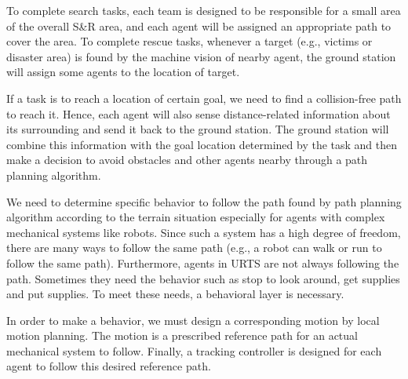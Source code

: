 \documentclass{ieeeaccess}
\begin{document}
To complete search tasks, each team is designed to be responsible for a small area of the overall S\&R area, and each agent will be assigned an appropriate path to cover the area. To complete rescue tasks, whenever a target (e.g., victims or disaster area) is found by the machine vision of nearby agent, the ground station will assign some agents to the location of target. 

If a task is to reach a location of certain goal, we need to find a collision-free path to reach it. 
Hence, each agent will also sense distance-related information about its surrounding and send it back to the ground station. The ground station will combine this information with the goal location determined by the task and then make a decision to avoid obstacles and other agents nearby through a path planning algorithm.

We need to determine specific behavior to follow the path found by path planning algorithm according to the terrain situation especially for agents with complex mechanical systems like robots. Since such a system has a high degree of freedom, there are many ways to follow the same path (e.g., a robot can walk or run to follow the same path). Furthermore, agents in URTS are not always following the path. Sometimes they need the behavior such as stop to look around, get supplies and put supplies. To meet these needs, a behavioral layer is necessary.

In order to make a behavior, we must design a corresponding motion by local motion planning. The motion is a prescribed reference path for an actual mechanical system to follow. Finally, a tracking controller is designed for each agent to follow this desired reference path.
\end{document}
